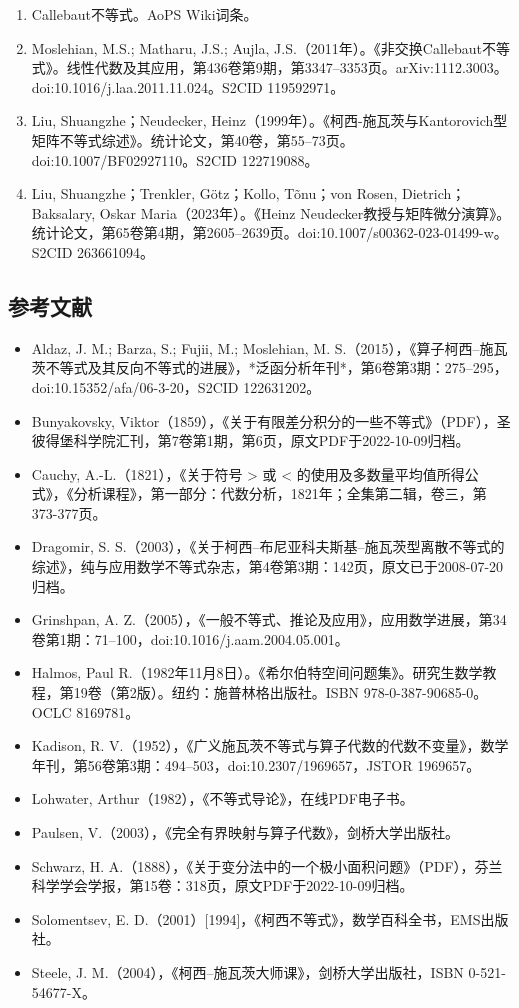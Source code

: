 \begin{enumerate}
\item Callebaut不等式。AoPS Wiki词条。
\item Moslehian, M.S.; Matharu, J.S.; Aujla, J.S.（2011年）。《非交换Callebaut不等式》。线性代数及其应用，第436卷第9期，第3347–3353页。arXiv:1112.3003。doi:10.1016/j.laa.2011.11.024。S2CID 119592971。
\item Liu, Shuangzhe；Neudecker, Heinz（1999年）。《柯西-施瓦茨与Kantorovich型矩阵不等式综述》。统计论文，第40卷，第55–73页。doi:10.1007/BF02927110。S2CID 122719088。
\item Liu, Shuangzhe；Trenkler, Götz；Kollo, Tõnu；von Rosen, Dietrich；Baksalary, Oskar Maria（2023年）。《Heinz Neudecker教授与矩阵微分演算》。统计论文，第65卷第4期，第2605–2639页。doi:10.1007/s00362-023-01499-w。S2CID 263661094。
\end{enumerate}
\subsection{参考文献}
\begin{itemize}
\item Aldaz, J. M.; Barza, S.; Fujii, M.; Moslehian, M. S.（2015），《算子柯西–施瓦茨不等式及其反向不等式的进展》，*泛函分析年刊*，第6卷第3期：275–295，doi:10.15352/afa/06-3-20，S2CID 122631202。
\item Bunyakovsky, Viktor（1859），《关于有限差分积分的一些不等式》（PDF），圣彼得堡科学院汇刊，第7卷第1期，第6页，原文PDF于2022-10-09归档。
\item Cauchy, A.-L.（1821），《关于符号 > 或 < 的使用及多数量平均值所得公式》，《分析课程》，第一部分：代数分析，1821年；全集第二辑，卷三，第373-377页。
\item Dragomir, S. S.（2003），《关于柯西–布尼亚科夫斯基–施瓦茨型离散不等式的综述》，纯与应用数学不等式杂志，第4卷第3期：142页，原文已于2008-07-20归档。
\item Grinshpan, A. Z.（2005），《一般不等式、推论及应用》，应用数学进展，第34卷第1期：71–100，doi:10.1016/j.aam.2004.05.001。
\item Halmos, Paul R.（1982年11月8日）。《希尔伯特空间问题集》。研究生数学教程，第19卷（第2版）。纽约：施普林格出版社。ISBN 978-0-387-90685-0。OCLC 8169781。
\item Kadison, R. V.（1952），《广义施瓦茨不等式与算子代数的代数不变量》，数学年刊，第56卷第3期：494–503，doi:10.2307/1969657，JSTOR 1969657。
\item Lohwater, Arthur（1982），《不等式导论》，在线PDF电子书。
\item Paulsen, V.（2003），《完全有界映射与算子代数》，剑桥大学出版社。
\item Schwarz, H. A.（1888），《关于变分法中的一个极小面积问题》（PDF），芬兰科学学会学报，第15卷：318页，原文PDF于2022-10-09归档。
\item Solomentsev, E. D.（2001）[1994]，《柯西不等式》，数学百科全书，EMS出版社。
\item Steele, J. M.（2004），《柯西–施瓦茨大师课》，剑桥大学出版社，ISBN 0-521-54677-X。
\end{itemize}

